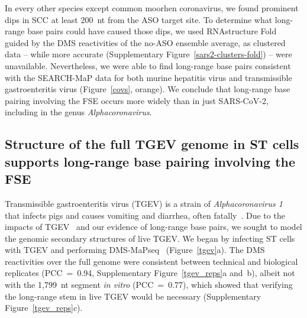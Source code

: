 \documentclass[main.tex]{subfiles}
\begin{document}
In every other species except common moorhen coronavirus, we found prominent dips in SCC at least 200~nt from the ASO target site.
To determine what long-range base pairs could have caused those dips, we used RNAstructure Fold~\cite{Reuter2010,Cordero2012} guided by the DMS reactivities of the no-ASO ensemble average, as clustered data -- while more accurate (Supplementary Figure~\ref{sars2-clusters-fold}) -- were unavailable.
Nevertheless, we were able to find long-range base pairs consistent with the SEARCH-MaP data for both murine hepatitis virus and transmissible gastroenteritis virus (Figure~\ref{covs}, orange).
We conclude that long-range base pairing involving the FSE occurs more widely than in just SARS-CoV-2, including in the genus \textit{Alphacoronavirus}.

\subsection{Structure of the full TGEV genome in ST cells supports long-range base pairing involving the FSE}

Transmissible gastroenteritis virus (TGEV) is a strain of \textit{Alphacoronavirus 1}~\cite{Whittaker2018} that infects pigs and causes vomiting and diarrhea, often fatally~\cite{Liu2021}.
Due to the impacts of TGEV~\cite{Liu2021} and our evidence of long-range base pairs, we sought to model the genomic secondary structures of live TGEV.
We began by infecting ST cells with TGEV and performing DMS-MaPseq~\cite{Zubradt2016} (Figure~\ref{tgev}a).
The DMS reactivities over the full genome were consistent between technical and biological replicates (PCC~=~0.94, Supplementary Figure~\ref{tgev_reps}a and~b), albeit not with the 1,799~nt segment \textit{in vitro} (PCC~=~0.77), which showed that verifying the long-range stem in live TGEV would be necessary (Supplementary Figure~\ref{tgev_reps}c).
\end{document}
